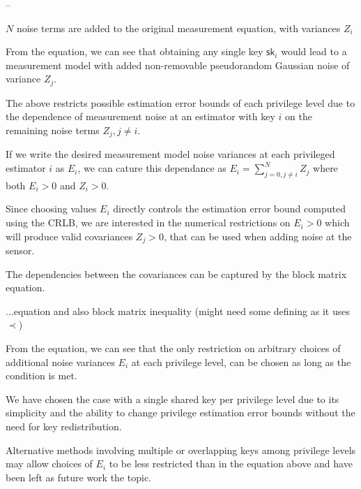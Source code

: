 \documentclass[conference]{IEEEtran}
\theoremstyle{definition}
\theoremstyle{definition}
\theoremstyle{remark}
\begin{document}
--

$N$ noise terms are added to the original measurement equation, with variances $Z_i$

From the equation, we can see that obtaining any single key $\mathsf{sk}_i$ would lead to a measurement model with added non-removable pseudorandom Gaussian noise of variance $Z_j$.

The above restricts possible estimation error bounds of each privilege level due to the dependence of measurement noise at an estimator with key $i$ on the remaining noise terms $Z_j,j\neq i$.

If we write the desired measurement model noise variances at each privileged estimator $i$ as $E_i$, we can cature this dependance as $E_i=\sum^N_{j=0,j\neq i}Z_j$ where both $E_i>0$ and $Z_i>0$.

Since choosing values $E_i$ directly controls the estimation error bound computed using the CRLB, we are interested in the numerical restrictions on $E_i>0$ which will produce valid covariances $Z_j>0$, that can be used when adding noise at the sensor.

The dependencies between the covariances can be captured by the block matrix equation.

...equation and also block matrix inequality (might need some defining as it uses $\prec$)

From the equation, we can see that the only restriction on arbitrary choices of additional noise variances $E_i$ at each privilege level, can be chosen as long as the condition is met.

We have chosen the case with a single shared key per privilege level due to its simplicity and the ability to change privilege estimation error bounds without the need for key redistribution.

Alternative methods involving multiple or overlapping keys among privilege levels may allow choices of $E_i$ to be less restricted than in the equation above and have been left as future work the topic.

% 
%                                                                                        
%                                                                                        
%                                                                                        
% 
\end{document}

